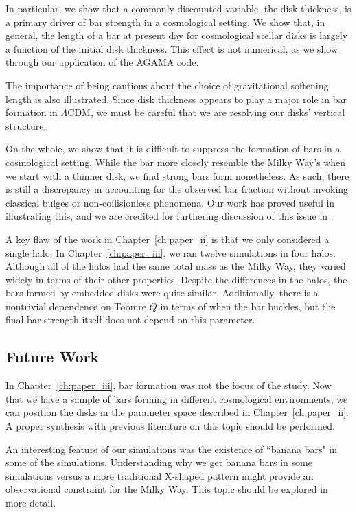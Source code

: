 In particular, we show that a commonly discounted variable, the disk thickness, is a primary driver of bar strength in a cosmological setting. We show that, in general, the length of a bar at present day for cosmological stellar disks is largely a function of the initial disk thickness. This effect is not numerical, as we show through our application of the \textsc{AGAMA} code. 

The importance of being cautious about the choice of gravitational softening length is also illustrated. Since disk thickness appears to play a major role in bar formation in $\Lambda$CDM, we must be careful that we are resolving our disks' vertical structure.


On the whole, we show that it is difficult to suppress the formation of bars in a cosmological setting. While the bar more closely resemble the Milky Way's when we start with a thinner disk, we find strong bars form nonetheless. As such, there is still a discrepancy in accounting for the observed bar fraction without invoking classical bulges or non-collisionless phenomena. Our work has proved useful in illustrating this, and we are credited for furthering discussion of this issue in \citet{sellwood_2019}.


A key flaw of the work in Chapter~\ref{ch:paper_ii} is that we only considered a single halo. In Chapter~\ref{ch:paper_iii}, we ran twelve simulations in four halos. Although all of the halos had the same total mass as the Milky Way, they varied widely in terms of their other properties. Despite the differences in the halos, the bars formed by embedded disks were quite similar. Additionally, there is a nontrivial dependence on Toomre $Q$ in terms of when the bar buckles, but the final bar strength itself does not depend on this parameter.


\subsection{Future Work}


In Chapter~\ref{ch:paper_iii}, bar formation was not the focus of the study. Now that we have a sample of bars forming in different cosmological environments, we can position the disks in the parameter space described in Chapter~\ref{ch:paper_ii}. A proper synthesis with previous literature on this topic should be performed.

An interesting feature of our simulations was the existence of ``banana bars" in some of the simulations. Understanding why we get banana bars in some simulations versus a more traditional X-shaped pattern might provide an observational constraint for the Milky Way. This topic should be explored in more detail.

